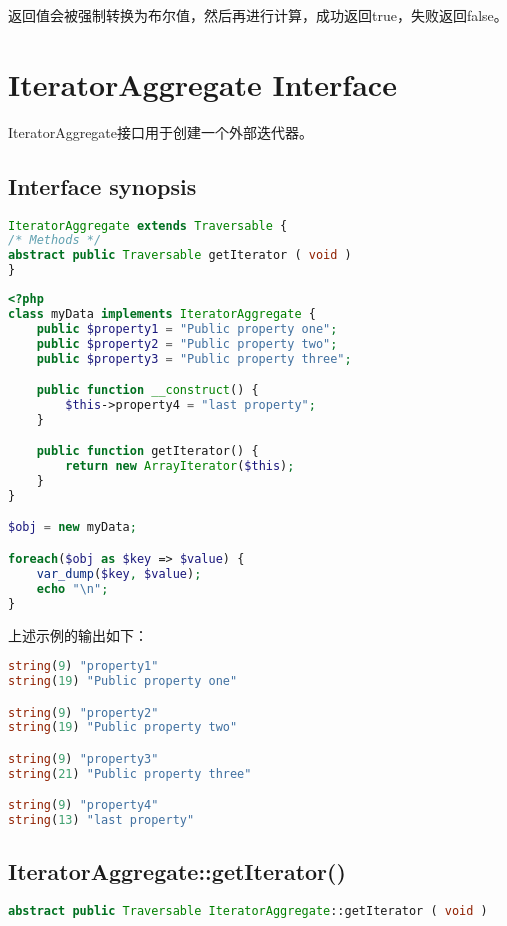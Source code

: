 返回值会被强制转换为布尔值，然后再进行计算，成功返回true，失败返回false。


\chapter{IteratorAggregate Interface}

IteratorAggregate接口用于创建一个外部迭代器。

\section{Interface synopsis}


\begin{lstlisting}[language=PHP]
IteratorAggregate extends Traversable {
/* Methods */
abstract public Traversable getIterator ( void )
}
\end{lstlisting}

\begin{lstlisting}[language=PHP]
<?php
class myData implements IteratorAggregate {
    public $property1 = "Public property one";
    public $property2 = "Public property two";
    public $property3 = "Public property three";

    public function __construct() {
        $this->property4 = "last property";
    }

    public function getIterator() {
        return new ArrayIterator($this);
    }
}

$obj = new myData;

foreach($obj as $key => $value) {
    var_dump($key, $value);
    echo "\n";
}
\end{lstlisting}

上述示例的输出如下：


\begin{lstlisting}[language=PHP]
string(9) "property1"
string(19) "Public property one"

string(9) "property2"
string(19) "Public property two"

string(9) "property3"
string(21) "Public property three"

string(9) "property4"
string(13) "last property"
\end{lstlisting}

\section{IteratorAggregate::getIterator()}


\begin{lstlisting}[language=PHP]
abstract public Traversable IteratorAggregate::getIterator ( void )
\end{lstlisting}

